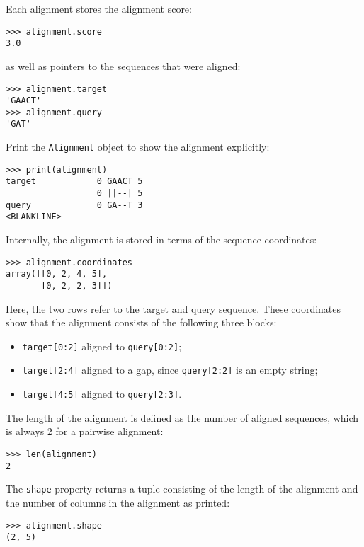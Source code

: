 Each alignment stores the alignment score:

\begin{verbatim}
>>> alignment.score
3.0
\end{verbatim}
as well as pointers to the sequences that were aligned:

\begin{verbatim}
>>> alignment.target
'GAACT'
>>> alignment.query
'GAT'
\end{verbatim}

Print the \verb+Alignment+ object to show the alignment explicitly:

\begin{verbatim}
>>> print(alignment)
target            0 GAACT 5
                  0 ||--| 5
query             0 GA--T 3
<BLANKLINE>
\end{verbatim}

Internally, the alignment is stored in terms of the sequence coordinates:

\begin{verbatim}
>>> alignment.coordinates
array([[0, 2, 4, 5],
       [0, 2, 2, 3]])
\end{verbatim}

Here, the two rows refer to the target and query sequence. These coordinates show that the alignment consists of the following three blocks:

\begin{itemize}
\item \verb+target[0:2]+ aligned to \verb+query[0:2]+;
\item \verb+target[2:4]+ aligned to a gap, since \verb+query[2:2]+ is an empty string;
\item \verb+target[4:5]+ aligned to \verb+query[2:3]+.
\end{itemize}

The length of the alignment is defined as the number of aligned sequences,
which is always 2 for a pairwise alignment:

\begin{verbatim}
>>> len(alignment)
2
\end{verbatim}

The \verb+shape+ property returns a tuple consisting of the length of the
alignment and the number of columns in the alignment as printed:

\begin{verbatim}
>>> alignment.shape
(2, 5)
\end{verbatim}

